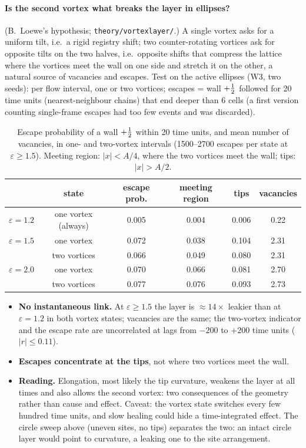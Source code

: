 \paragraph{Is the second vortex what breaks the layer in ellipses?} (B.~Loewe's hypothesis; \texttt{theory/vortexlayer/}.) A single vortex asks for a uniform tilt, i.e.\
a rigid registry shift; two counter-rotating vortices ask for opposite tilts on the two halves, i.e.\ opposite shifts that compress the lattice where the vortices meet the
wall on one side and stretch it on the other, a natural source of vacancies and escapes. Test on the active ellipses (W3, two seeds): per flow interval, one or two
vortices; escapes = wall $+\tfrac12$ followed for 20 time units (nearest-neighbour chains) that end deeper than 6 cells (a first version counting single-frame escapes had too
few events and was discarded).
\begin{table}[H]\centering\small
\caption{Escape probability of a wall $+\tfrac12$ within 20 time units, and mean number of vacancies, in one- and two-vortex intervals (1500--2700 escapes per state at
$\varepsilon\ge1.5$). Meeting region: $|x|<A/4$, where the two vortices meet the wall; tips: $|x|>A/2$.}\label{tab:vortexlayer}
\begin{tabular}{lccccc}\toprule
& state & escape prob. & meeting region & tips & vacancies\\\midrule
$\varepsilon=1.2$ & one vortex (always) & 0.005 & 0.004 & 0.006 & 0.22\\
$\varepsilon=1.5$ & one vortex & 0.072 & 0.038 & 0.104 & 2.31\\
 & two vortices & 0.066 & 0.049 & 0.080 & 2.31\\
$\varepsilon=2.0$ & one vortex & 0.070 & 0.066 & 0.081 & 2.70\\
 & two vortices & 0.077 & 0.076 & 0.093 & 2.73\\\bottomrule
\end{tabular}
\end{table}
\begin{itemize}
  \item \textbf{No instantaneous link.} At $\varepsilon\ge1.5$ the layer is $\approx14\times$ leakier than at $\varepsilon=1.2$ in both vortex states; vacancies are the same; the
        two-vortex indicator and the escape rate are uncorrelated at lags from $-200$ to $+200$ time units ($|r|\le0.11$).
  \item \textbf{Escapes concentrate at the tips}, not where two vortices meet the wall.
  \item \textbf{Reading.} Elongation, most likely the tip curvature, weakens the layer at all times and also allows the second vortex: two consequences of the geometry rather
        than cause and effect. Caveat: the vortex state switches every few hundred time units, and slow healing could hide a time-integrated effect. The circle sweep above
        (uneven sites, no tips) separates the two: an intact circle layer would point to curvature, a leaking one to the site arrangement.
\end{itemize}

